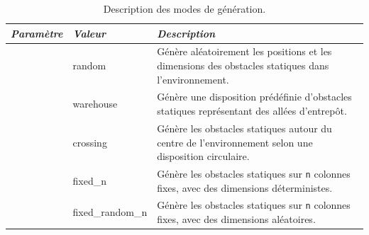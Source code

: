 \begin{table}[h]
    \centering
    \caption{Description des modes de génération.}
    \label{tab:generation_modes}
    \begin{tabularx}{\textwidth}{>{\ttfamily\small}l >{\ttfamily\small}l X}
        \toprule
        \textnormal{\textit{Paramètre}} &
        \textnormal{\textit{Valeur}}    &
        \textit{Description}                                                                                                                                                                                                                                                                                       \\
        \midrule

        \multirow{5}{*}{env\_mode}
                                        & random
                                        & Génère aléatoirement les positions et les dimensions des obstacles statiques dans l'environnement.                                                                                                                                                                       \\

                                        & warehouse
                                        & Génère une disposition prédéfinie d'obstacles statiques représentant des allées d'entrepôt.                                                                                                                                                                              \\

                                        & crossing
                                        & Génère les obstacles statiques autour du centre de l'environnement selon une disposition circulaire.                                                                                                                                                                     \\

                                        & fixed\_n
                                        & Génère les obstacles statiques sur \texttt{n} colonnes fixes, avec des dimensions déterministes.                                                                                                                                                                         \\

                                        & fixed\_random\_n
                                        & Génère les obstacles statiques sur \texttt{n} colonnes fixes, avec des dimensions aléatoires.                                                                                                                                                                            \\


\end{tabularx}
\end{table}
